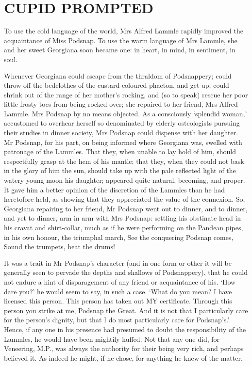 
\chapter{CUPID PROMPTED}

To use the cold language of the world, Mrs Alfred Lammle rapidly
improved the acquaintance of Miss Podsnap. To use the warm language of
Mrs Lammle, she and her sweet Georgiana soon became one: in heart, in
mind, in sentiment, in soul.

Whenever Georgiana could escape from the thraldom of Podsnappery; could
throw off the bedclothes of the custard-coloured phaeton, and get up;
could shrink out of the range of her mother’s rocking, and (so to speak)
rescue her poor little frosty toes from being rocked over; she repaired
to her friend, Mrs Alfred Lammle. Mrs Podsnap by no means objected. As
a consciously ‘splendid woman,’ accustomed to overhear herself so
denominated by elderly osteologists pursuing their studies in dinner
society, Mrs Podsnap could dispense with her daughter. Mr Podsnap, for
his part, on being informed where Georgiana was, swelled with patronage
of the Lammles. That they, when unable to lay hold of him, should
respectfully grasp at the hem of his mantle; that they, when they could
not bask in the glory of him the sun, should take up with the pale
reflected light of the watery young moon his daughter; appeared quite
natural, becoming, and proper. It gave him a better opinion of the
discretion of the Lammles than he had heretofore held, as showing that
they appreciated the value of the connexion. So, Georgiana repairing
to her friend, Mr Podsnap went out to dinner, and to dinner, and yet to
dinner, arm in arm with Mrs Podsnap: settling his obstinate head in his
cravat and shirt-collar, much as if he were performing on the Pandean
pipes, in his own honour, the triumphal march, See the conquering
Podsnap comes, Sound the trumpets, beat the drums!

It was a trait in Mr Podsnap’s character (and in one form or other
it will be generally seen to pervade the depths and shallows of
Podsnappery), that he could not endure a hint of disparagement of any
friend or acquaintance of his. ‘How dare you?’ he would seem to say, in
such a case. ‘What do you mean? I have licensed this person. This person
has taken out MY certificate. Through this person you strike at me,
Podsnap the Great. And it is not that I particularly care for the
person’s dignity, but that I do most particularly care for Podsnap’s.’
Hence, if any one in his presence had presumed to doubt the
responsibility of the Lammles, he would have been mightily huffed. Not
that any one did, for Veneering, M.P., was always the authority for
their being very rich, and perhaps believed it. As indeed he might, if
he chose, for anything he knew of the matter.

